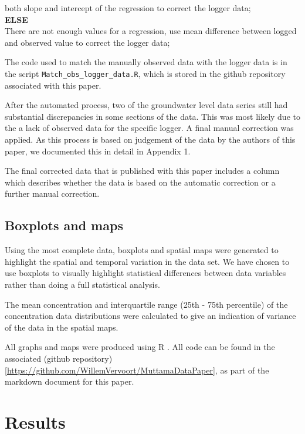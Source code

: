 \documentclass[, manuscript]{copernicus}
\begin{document}
both slope and intercept of the regression to correct the logger data;\\
\textbf{ELSE}\\
\hspace*{0.333em}\hspace*{0.333em}There are not enough values for a
regression, use mean difference between logged and observed value to
correct the logger data;

The code used to match the manually observed data with the logger data
is in the script \texttt{Match\_obs\_logger\_data.R}, which is stored in
the github repository associated with this paper.

After the automated process, two of the groundwater level data series
still had substantial discrepancies in some sections of the data. This
was most likely due to the a lack of observed data for the specific
logger. A final manual correction was applied. As this process is based
on judgement of the data by the authors of this paper, we documented
this in detail in Appendix 1.

The final corrected data that is published with this paper includes a
column which describes whether the data is based on the automatic
correction or a further manual correction.

\subsection{Boxplots and maps}

Using the most complete data, boxplots and spatial maps were generated
to highlight the spatial and temporal variation in the data set. We have
chosen to use boxplots to visually highlight statistical differences
between data variables rather than doing a full statistical analysis.

The mean concentration and interquartile range (25th - 75th percentile)
of the concentration data distributions were calculated to give an
indication of variance of the data in the spatial maps.

All graphs and maps were produced using R \citep{R2024}. All code can be
found in the associated (github
repository){[}\url{https://github.com/WillemVervoort/MuttamaDataPaper}{]},
as part of the markdown document for this paper.

\section{Results}
\end{document}
